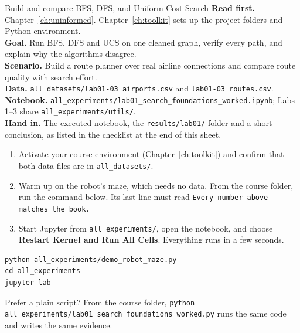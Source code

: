
\begin{labproject}{Build and compare BFS, DFS, and Uniform-Cost Search}
\textbf{Read first.} Chapter~\ref{ch:uninformed}. Chapter~\ref{ch:toolkit} sets up the project folders and Python environment.\\
\textbf{Goal.} Run BFS, DFS and UCS on one cleaned graph, verify every path, and explain why the algorithms disagree.\\
\textbf{Scenario.} Build a route planner over real airline connections and compare route quality with search effort.\\
\textbf{Data.} \texttt{all\_datasets/lab01-03\_airports.csv} and \texttt{lab01-03\_routes.csv}.\\
\textbf{Notebook.} \texttt{all\_experiments/lab01\_search\_foundations\_worked.ipynb}; Labs 1--3 share \texttt{all\_experiments/utils/}.\\
\textbf{Hand in.} The executed notebook, the \texttt{results/lab01/} folder and a short conclusion, as listed in the checklist at the end of this sheet.
\end{labproject}

\begin{labmode}
\begin{enumerate}
  \item Activate your course environment (Chapter~\ref{ch:toolkit}) and confirm that both data files are in \texttt{all\_datasets/}.
  \item Warm up on the robot's maze, which needs no data. From the course folder, run the command below. Its last line must read \texttt{Every number above matches the book.}
  \item Start Jupyter from \texttt{all\_experiments/}, open the notebook, and choose \textbf{Restart Kernel and Run All Cells}. Everything runs in a few seconds.
\end{enumerate}
\begin{lstlisting}[style=utpterminal]
python all_experiments/demo_robot_maze.py
cd all_experiments
jupyter lab
\end{lstlisting}
Prefer a plain script? From the course folder, \texttt{python all\_experiments/lab01\_search\_foundations\_worked.py} runs the same code and writes the same evidence.
\end{labmode}



\labroutine

